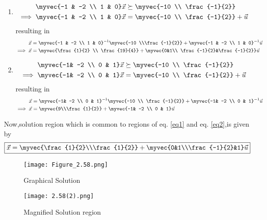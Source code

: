 \documentclass[journal,12pt,twocolumn]{IEEEtran}
\begin{document}
\begin{enumerate}
    \item 
    \begin{align}
        \myvec{-1 & -2 \\ 1 & 0}\vec{x} &\succeq \myvec{-10 \\ \frac{-1}{2}}
        \\
        \implies  \myvec{-1 & -2 \\ 1 & 0}\vec{x} &= \myvec{-10 \\ \frac{-1}{2}} + \vec{u}
    \end{align}
    resulting in 
    \begin{align}
        \vec{x} &= \myvec{-1 & -2 \\ 1 & 0}^{-1}\myvec{-10 \\\frac{-1}{2}} + \myvec{-1 & -2 \\ 1 & 0}^{-1}\vec{u}
        \\
        \implies \vec{x} &= \myvec{\frac{1}{2} \\ \frac{19}{4}} + \myvec{0&1\\ \frac{-1}{2}&\frac{-1}{2}}\vec{u}   \label{eq1}
    \end{align}
    \item 
    \begin{align}
        \myvec{-1& -2 \\ 0 & 1}\vec{x} &\succeq \myvec{-10 \\ \frac{-1}{2}}
        \\
        \implies  \myvec{-1& -2 \\ 0 & 1}\vec{x} &= \myvec{-10 \\ \frac{-1}{2}} + \vec{u}
    \end{align}
    resulting in 
    \begin{align}
        \vec{x} &= \myvec{-1& -2 \\ 0 & 1}^{-1}\myvec{-10 \\ \frac{-1}{2}} + \myvec{-1& -2 \\ 0 & 1}^{-1}\vec{u}
        \\
        \implies \vec{x} &= \myvec{9\\\frac{1}{2}} + \myvec{-1& -2 \\ 0 & 1}\vec{u} \label{eq2}
    \end{align}
\end{enumerate}
Now,solution region which is common to regions of eq. \eqref{eq1} and eq. \eqref{eq2},is given by
\begin{align}
    \boxed{\vec{x} = \myvec{\frac{1}{2}\\\frac{1}{2}}+\myvec{0&1\\\frac{-1}{2}&1}\vec{u}}
\end{align}
\begin{figure}[!ht]
\centering
\texttt{[image: Figure\_2.58.png]}
\caption{Graphical Solution}
\label{fig:fig1}	
\end{figure}

\begin{figure}[!ht]
\centering
\texttt{[image: 2.58(2).png]}
\caption{Magnified Solution region}
\label{fig:fig2}	
\end{figure}
\end{document}
